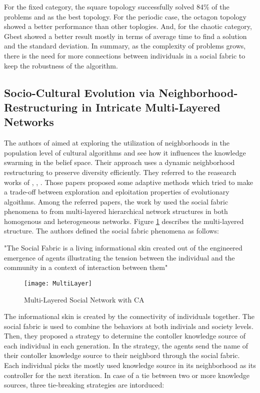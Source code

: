 For the fixed category, the square topology successfully solved 84\% of the problems and as the best topology. For the periodic case, the octagon topology showed a better performance than other toplogies. And, for the chaotic category, Gbest showed a better result mostly in terms of average time to find a solution and the standard deviation. In summary, as the complexity of problems grows, there is the need for more connections between individuals in a social fabric to keep the robustness of the algorithm.
\subsection{Socio-Cultural Evolution via Neighborhood-Restructuring in Intricate Multi-Layered Networks}
The authors of \cite{ali2012socio} aimed at exploring the utilization of neighborhoods in the population level of cultural algorithms and see how it influences the knowledge swarming in the belief space. Their approach uses a dynamic neighborhood restructuring to preserve diversity efficiently. They referred to the reasearch works of \cite{elsayed2011differential}, \cite{asafuddoula2011adaptive}, \cite{asafuddoula2011adaptive}. Those papers proposed some adaptive methods which tried to make a trade-off between exploration and eploitation properties of evolutionary algoithms. Among the referred papers, the work by \cite{ali2010enhancing} used the social fabric phenomena to from multi-layered hierarchical network structures in both homogenous and heterogeneous networks. Figure \ref{fig:MLAYER} describes the multi-layered structure.\newline
The authors defined the social fabric phenomena as follows:
\begin{displayquote}
	"The Social Fabric is a living informational skin created out of the engineered emergence of agents illustrating the tension between the individual and the community in a context of interaction between them"
\end{displayquote}
\begin{figure}[h]
	\texttt{[image: MultiLayer]}
	\centering
	\caption{Multi-Layered Social Network with CA \cite{kobti2013heterogeneous}}
	\label{fig:MLAYER}
\end{figure}
The informational skin is created by the connectivity of individuals together. The social fabric is used to combine the behaviors at both indivials and society levels. Then, they proposed a strategy to determine the contoller knowledge source of each individual in each generation. In the strategy, the agents send the name of their contoller knowledge source to their neighbord through the social fabric. Each individual picks the mostly used knowledge source in its neighborhood as its controller for the next iteration. In case of a tie between two or more knowledge sources, three tie-breaking strategies are intorduced:
